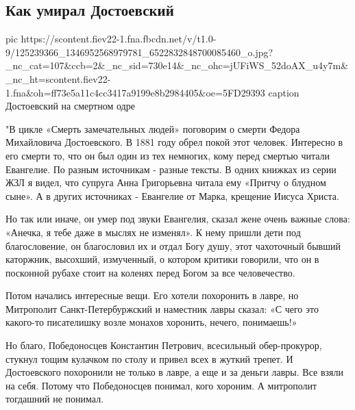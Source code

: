 
 
 

\subsection{Как умирал Достоевский}
\label{sec:13_11_2020.fb.evgeniy_maslov.1.dostoevskii_kak_umiral}


\ifcmt

pic https://scontent.fiev22-1.fna.fbcdn.net/v/t1.0-9/125239366_1346952568979781_6522832848700085460_o.jpg?_nc_cat=107&ccb=2&_nc_sid=730e14&_nc_ohc=jUFiWS_52doAX_u4y7m&_nc_ht=scontent.fiev22-1.fna&oh=ff73e5a11c4cc3417a9199e8b2984405&oe=5FD29393
caption Достоевский на смертном одре

\fi

"В цикле «Смерть замечательных людей» поговорим о смерти Федора Михайловича
Достоевского. В 1881 году обрел покой этот человек. Интересно в его смерти
то, что он был один из тех немногих, кому перед смертью читали Евангелие. По
разным источникам - разные тексты. В одних книжках из серии ЖЗЛ я видел, что
супруга Анна Григорьевна читала ему «Притчу о блудном сыне». А в других
источниках - Евангелие от Марка, крещение Иисуса Христа.

Но так или иначе, он умер под звуки Евангелия, сказал жене очень важные слова:
«Анечка, я тебе даже в мыслях не изменял». К нему пришли дети под
благословение, он благословил их и отдал Богу душу, этот чахоточный бывший
каторжник, высохший, измученный, о котором критики говорили, что он в посконной
рубахе стоит на коленях перед Богом за все человечество.

Потом начались интересные вещи. Его хотели похоронить в лавре, но Митрополит
Санкт-Петербуржский и наместник лавры сказал: «С чего это какого-то писателишку
возле монахов хоронить, нечего, понимаешь!»

Но благо, Победоносцев Константин Петрович, всесильный обер-прокурор, стукнул
тощим кулачком по столу и привел всех в жуткий трепет. И Достоевского
похоронили не только в лавре, а еще и за деньги лавры. Все взяли на себя.
Потому что Победоносцев понимал, кого хороним. А митрополит тогдашний не
понимал.


